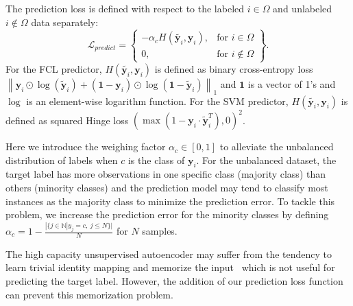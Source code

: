 The prediction loss is defined with respect to the labeled $i \in \Omega$ and unlabeled $i \not\in \Omega$ data separately:
\begin{equation}
    \mathcal{L}_{predict} = \left\{\begin{array}{lr}
        - \alpha_c H(\tilde{{\mathbf{y}_i}}, \mathbf{y}_i), & \text{for } i \in \Omega\\
        0, & \text{for } i \not\in \Omega
    \end{array}\right\}.
\end{equation}
For the FCL predictor, $H(\tilde{{\mathbf{y}_i}}, \mathbf{y}_i)$ is defined as binary cross-entropy loss $\left\|\mathbf{y}_i \odot \operatorname{log}(\tilde{\mathbf{y}}_i) + (\mathbf{1} - \mathbf{y}_i) \odot \operatorname{log}(\mathbf{1} - \tilde{\mathbf{y}}_i)\right\|_1$ and $\mathbf{1}$ is a vector of 1's and $\operatorname{log}$ is an element-wise logarithm function. For the SVM predictor, $H(\tilde{{\mathbf{y}_i}}, \mathbf{y}_i)$ is defined as squared Hinge loss $(\operatorname{max}(1 - \mathbf{y}_i \cdot \tilde{\mathbf{y}}_i^T), 0)^2$.

Here we introduce the weighing factor $\alpha_c \in [0, 1]$ to alleviate the unbalanced distribution of labels when $c$ is the class of $\mathbf{y}_i$. For the unbalanced dataset, the target label has more observations in one specific class (majority class) than others (minority classes) and the prediction model may tend to classify most instances as the majority class to minimize the prediction error. To tackle this problem, we increase the prediction error for the minority classes by defining $\alpha_c = 1 - \frac{|\{j \in \mathbb{N}| y_j = c,\ j \leq N\}|}{N}$ for $N$ samples.


The high capacity unsupervised autoencoder may suffer from the tendency to learn trivial identity mapping and memorize the input~\cite{srivastava2015unsupervised} which is not useful for predicting the target label. However, the addition of our prediction loss function can prevent this memorization problem.


